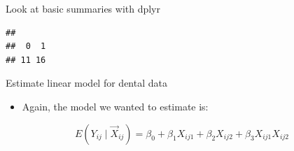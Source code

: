 \documentclass[ignorenonframetext,]{beamer}
\newenvironment{Shaded}{\begin{snugshade}}{\end{snugshade}}
\newcommand{\KeywordTok}[1]{\textcolor[rgb]{0.13,0.29,0.53}{\textbf{#1}}}
\newcommand{\DataTypeTok}[1]{\textcolor[rgb]{0.13,0.29,0.53}{#1}}
\newcommand{\StringTok}[1]{\textcolor[rgb]{0.31,0.60,0.02}{#1}}
\newcommand{\CommentTok}[1]{\textcolor[rgb]{0.56,0.35,0.01}{\textit{#1}}}
\newcommand{\OperatorTok}[1]{\textcolor[rgb]{0.81,0.36,0.00}{\textbf{#1}}}
\newcommand{\NormalTok}[1]{#1}
\providecommand{\tightlist}{%
  \setlength{\itemsep}{0pt}\setlength{\parskip}{0pt}}
\begin{document}
\begin{frame}[fragile]{Look at basic summaries with dplyr}

\begin{Shaded}
\end{Shaded}

\begin{verbatim}
## 
##  0  1 
## 11 16
\end{verbatim}

\end{frame}

\begin{frame}{Estimate linear model for dental data}

\begin{itemize}
\tightlist
\item
  Again, the model we wanted to estimate is:
\end{itemize}

\[ E(Y_{ij} \mid \vec{X}_{ij}) = \beta_0 +\beta_1 X_{ij1}+\beta_2 X_{ij2} + \beta_3 X_{ij1}X_{ij2} \]

\end{frame}
\end{document}
